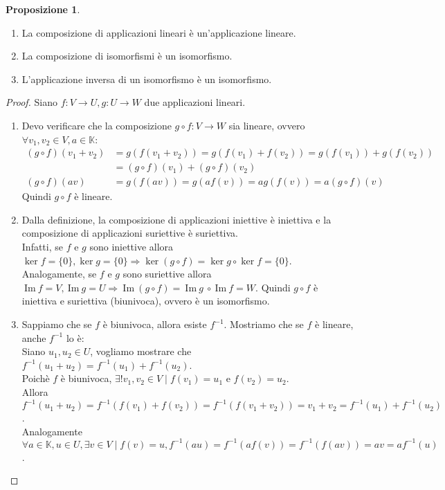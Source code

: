 \documentclass[a4paper]{article}
\newcommand{\IM}{\ \mathrm{Im} \ }
\theoremstyle{definition}
\newtheorem*{prop}{Proposizione}
\begin{document}
\begin{prop}
	\begin{enumerate}
		\item La composizione di applicazioni lineari è un'applicazione lineare.
		\item La composizione di isomorfismi è un isomorfismo.
		\item L'applicazione inversa di un isomorfismo è un isomorfismo.
	\end{enumerate}
\end{prop}
\begin{proof}
	Siano $f: V \rightarrow U, g: U \rightarrow W$ due applicazioni lineari.
	\begin{enumerate}
		\item Devo verificare che la composizione $g \circ f: V \rightarrow W$ sia lineare, ovvero $\forall v_1, v_2 \in V, a \in \mathbb{K}$:
		      \begin{align*}
			      (g \circ f)(v_1 + v_2) & = g(f(v_1 + v_2)) = g(f(v_1) + f(v_2)) = g(f(v_1)) + g(f(v_2)) \\
				  						 & = (g \circ f)(v_1) + (g \circ f)(v_2) \\
			      (g \circ f)(av)        & = g(f(av)) = g(af(v)) = ag(f(v)) = a(g \circ f)(v)
		      \end{align*}
			  Quindi $g \circ f$ è lineare.
		\item Dalla definizione, la composizione di applicazioni iniettive è iniettiva e la composizione di applicazioni suriettive è suriettiva. \\
		      Infatti, se $f$ e $g$ sono iniettive allora $\ker f = \{0\}, \ker g = \{0\} \Rightarrow \ker(g \circ f) = \ker g \circ \ker f = \{0\}$. \\
			  Analogamente, se $f$ e $g$ sono suriettive allora $\IM f = V, \IM g = U \Rightarrow \IM(g \circ f) = \IM g \ \circ \IM f = W$.
			  Quindi $g \circ f$ è iniettiva e suriettiva (biunivoca), ovvero è un isomorfismo.
		\item Sappiamo che se $f$ è biunivoca, allora esiste $f^{-1}$. Mostriamo che se $f$ è lineare, anche $f^{-1}$ lo è: \\
			  Siano $u_1, u_2 \in U$, vogliamo mostrare che $f^{-1}(u_1 + u_2) = f^{-1}(u_1) + f^{-1}(u_2)$. \\
			  Poichè $f$ è biunivoca, $\exists! v_1, v_2 \in V \mid f(v_1) = u_1$ e $f(v_2) = u_2$. \\
			  Allora $f^{-1}(u_1 + u_2) = f^{-1}(f(v_1) + f(v_2)) = f^{-1}(f(v_1 + v_2)) = v_1 + v_2 = f^{-1}(u_1) + f^{-1}(u_2)$. \\
			  Analogamente $\forall a \in \mathbb{K}, u \in U, \exists v \in V \mid f(v) = u, f^{-1}(au) = f^{-1}(af(v)) = f^{-1}(f(av)) = av = af^{-1}(u)$.
	\end{enumerate}
	\begin{center}


\end{center}
\end{proof}
\end{document}
